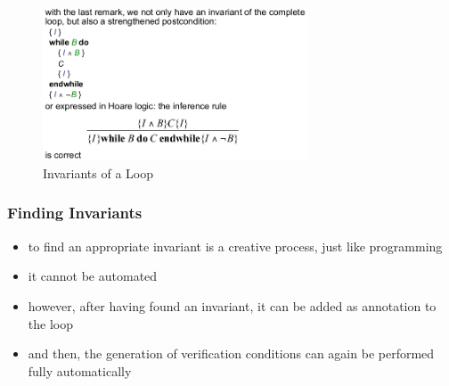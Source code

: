 \begin{figure}[H]
\centering
\includegraphics[width=0.7\textwidth]{figures/invariantLoop.png}
\caption{Invariants of a Loop}
\end{figure}

\hypertarget{finding-invariants}{%
\subsubsection{Finding Invariants}\label{finding-invariants}}

\begin{itemize}
\tightlist
\item
  to find an appropriate invariant is a creative process, just like
  programming
\item
  it cannot be automated
\item
  however, after having found an invariant, it can be added as
  annotation to the loop
\item
  and then, the generation of verification conditions can again be
  performed fully automatically
\end{itemize}

\clearpage